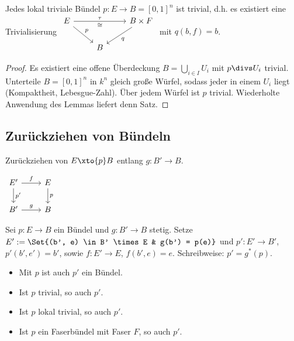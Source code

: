 \begin{st}
    Jedes lokal triviale Bündel $p: E \to B = [0,1]^n$ ist trivial, d.h. es existiert eine Trivialisierung
    \begin{math}
        \begin{tikzcd}
            E \ar[rr,"\tau","\homeomorphic"'] \ar[rd,"p"] & & B \times F \ar[ld,"q"] \\
            ~& B &
        \end{tikzcd}
    \end{math}
    mit $q(b,f) = b$.
    \begin{proof}
        Es existiert eine offene Überdeckung $B = \bigcup_{i \in I} U_i$ mit $p\over U_i$ trivial.
        Unterteile $B = [0,1]^n$ in $k^n$ gleich große Würfel, sodass jeder in einem $U_i$ liegt (Kompaktheit, Lebesgue-Zahl).
        Über jedem Würfel ist $p$ trivial.
        Wiederholte Anwendung des Lemmas liefert denn Satz.
    \end{proof}
\end{st}

\subsection{Zurückziehen von Bündeln}

Zurückziehen von $E \xto{p} B$ entlang $g: B' \to B$.

\begin{math}
    \begin{tikzcd}
        E' \ar[d,"p'"] \ar[r,"f"] & E \ar[d,"p"] \\
        B' \ar[r,"g"] & B
    \end{tikzcd}
\end{math}

\begin{df}
    Sei $p: E \to B$ ein Bündel und $g: B' \to B$ stetig.
    Setze
    \begin{math}
        E' := \Set{(b', e) \in B' \times E & g(b') = p(e)}
    \end{math}
    und $p': E' \to B'$, $p'(b', e') = b'$, sowie $f: E' \to E$, $f(b', e) = e$.
    Schreibweise: $p' = g^*(p)$.
    \begin{note}
        \begin{itemize}
            \item
                Mit $p$ ist auch $p'$ ein Bündel.
            \item
                Ist $p$ trivial, so auch $p'$.
            \item
                Ist $p$ lokal trivial, so auch $p'$.
            \item
                Ist $p$ ein Faserbündel mit Faser $F$, so auch $p'$.
        \end{itemize}
    \end{note}
\end{df}

